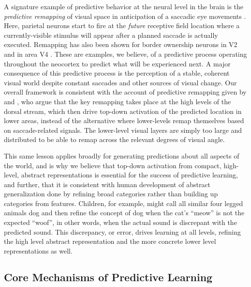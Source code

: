 \documentclass[11pt,twoside]{article}
\newif\myifpdf
\begin{document}
A signature example of predictive behavior at the neural level in the brain is the {\em predictive remapping} of visual space in anticipation of a saccadic eye movements \cite{DuhamelColbyGoldberg92,ColbyDuhamelGoldberg97,GottliebKusunokiGoldberg98,NakamuraColby02,MarinoMazer16}.  Here, parietal neurons start to fire at the {\em future} receptive field location where a currently-visible stimulus will appear after a planned saccade is actually executed. Remapping has also been shown for border ownership neurons in V2 \cite{OHerronvonderHeydt13} and in area V4 \cite{NeupaneGuittonPack16}. These are examples, we believe, of a predictive process operating throughout the neocortex to predict what will be experienced next.  A major consequence of this predictive process is the perception of a stable, coherent visual world despite constant saccades and other sources of visual change.  Our overall framework is consistent with the account of predictive remapping given by  and , who argue that the key remapping takes place at the high levels of the dorsal stream, which then drive top-down activation of the predicted location in lower areas, instead of the alternative where lower-levels remap themselves based on saccade-related signals.  The lower-level visual layers are simply too large and distributed to be able to remap across the relevant degrees of visual angle.

This same lesson applies broadly for generating predictions about all aspects of the world, and is why we believe that top-down activation from compact, high-level, abstract representations is essential for the success of predictive learning, and further, that it is consistent with human development of abstract generalization done by refining broad categories rather than building up categories from features. Children, for example, might call all similar four legged animals dog and then refine the concept of dog when the cat's ``meow'' is not the expected ``woof'', in other words, when the actual sound is discrepant with the predicted sound. This discrepancy, or error, drives learning at all levels, refining the high level abstract representation and the more concrete lower level representations as well.

\subsection{Core Mechanisms of Predictive Learning}
\end{document}
